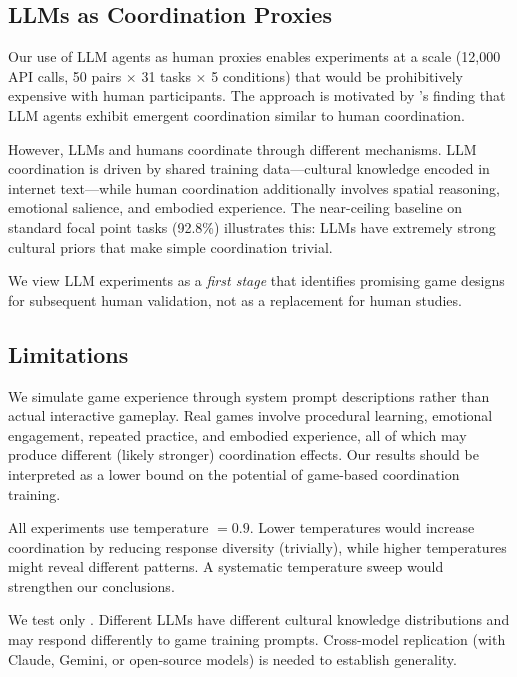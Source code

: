 \subsection{LLMs as Coordination Proxies}
\label{sec:proxies}

Our use of LLM agents as human proxies enables experiments at a scale (12,000 API calls, 50 pairs $\times$ 31 tasks $\times$ 5 conditions) that would be prohibitively expensive with human participants.
The approach is motivated by \citet{riedl2026emergent}'s finding that LLM agents exhibit emergent coordination similar to human coordination.

However, LLMs and humans coordinate through different mechanisms.
LLM coordination is driven by shared training data---cultural knowledge encoded in internet text---while human coordination additionally involves spatial reasoning, emotional salience, and embodied experience.
The near-ceiling baseline on standard focal point tasks (92.8\%) illustrates this: LLMs have extremely strong cultural priors that make simple coordination trivial.

We view LLM experiments as a \emph{first stage} that identifies promising game designs for subsequent human validation, not as a replacement for human studies.

\subsection{Limitations}
\label{sec:limitations}

We simulate game experience through system prompt descriptions rather than actual interactive gameplay.
Real games involve procedural learning, emotional engagement, repeated practice, and embodied experience, all of which may produce different (likely stronger) coordination effects.
Our results should be interpreted as a lower bound on the potential of game-based coordination training.

All experiments use temperature $= 0.9$.
Lower temperatures would increase coordination by reducing response diversity (trivially), while higher temperatures might reveal different patterns.
A systematic temperature sweep would strengthen our conclusions.

We test only \gptfour.
Different LLMs have different cultural knowledge distributions and may respond differently to game training prompts.
Cross-model replication (\eg with Claude, Gemini, or open-source models) is needed to establish generality.

